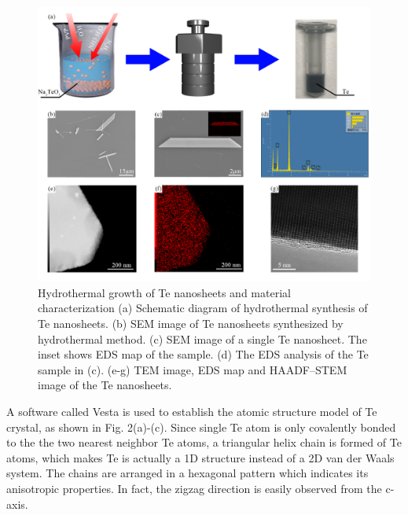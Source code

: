\documentclass[journal=jacsat,manuscript=article]{achemso}
\begin{document}
\begin{figure}
  \centering
  \includegraphics[width=\linewidth]{method.png}
  \caption{Hydrothermal growth of Te nanosheets and material characterization (a) Schematic diagram of hydrothermal synthesis of Te nanosheets. (b) SEM image of Te nanosheets synthesized by hydrothermal method. (c) SEM image of a single Te nanosheet. The inset shows EDS map of the sample. (d) The EDS analysis of the Te sample in (c). (e-g) TEM image, EDS map and HAADF–STEM image of the Te nanosheets.}
    \label{fig:method}
\end{figure}

A software called Vesta is used to establish the atomic structure model of Te crystal, as shown in Fig. 2(a)-(c). Since single Te atom is only covalently bonded to the the two nearest neighbor Te atoms,  a triangular helix chain is formed of Te atoms, which makes Te is actually a 1D structure instead of a 2D van der Waals system. The chains are arranged in a hexagonal pattern which indicates its anisotropic properties. In fact, the zigzag direction is easily observed from the c-axis.
\end{document}
